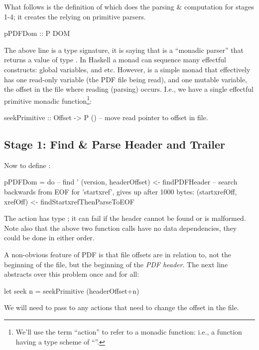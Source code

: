What follows is the definition of  which does the
parsing \& computation for stages 1-4;
it creates the  relying on primitive parsers.
\begin{code}
pPDFDom :: P DOM
\end{code}
The above line is a type signature, it is saying that
 is a ``monadic parser''  that returns a
value of type .
In Haskell a monad can sequence many effectful constructs: global variables,
and etc. However,  is a simple monad that effectively has one
read-only variable (the PDF file being read), and one mutable variable,
the offset in the file where reading (parsing) occurs.  I.e., we have
a single effectful primitive monadic function\footnote{
  We'll use the term ``action'' to refer to a monadic function:
  i.e., a function having a type scheme of ``''.
}:
\begin{codeNoExecute}
seekPrimitive :: Offset -> P () -- move read pointer to offset in file.
\end{codeNoExecute}

\subsection{Stage 1: Find \& Parse Header and Trailer}

Now to define :
\begin{code}
pPDFDom =
    do
    -- find '%
    (version, headerOffset) <- findPDFHeader
    -- search backwards from EOF for 'startxref', gives up after 1000 bytes:
    (startxrefOff, xrefOff) <- findStartxrefThenParseToEOF
\end{code}

The action  has type ;
it can fail if the header cannot be found or is malformed.
%
Note also that the above two function calls have no data dependencies, they
could be done in either order.

A non-obvious feature of PDF is that file offsets are in relation to, not the
beginning of the file, but the beginning of the \emph{PDF header}.
%
The next line abstracts over this problem once and for all:
\begin{code}  
    let seek n = seekPrimitive (headerOffset+n)
\end{code}
We will need to pass  to any actions that need to change
the offset in the file.

